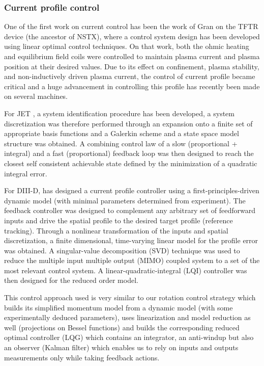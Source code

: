 \documentclass[12pt,lot, lof]{puthesis}
\begin{document}
\subsubsection{Current profile control}
One of the first work on current control has been the work of Gran \cite{Gran77} on the TFTR device (the ancestor of NSTX), where a control system design has been developed using linear optimal control techniques. On that work, both the ohmic heating and equilibrium field coils were controlled to maintain plasma current and plasma position at their desired values.
Due to its effect on confinement, plasma stability, and non-inductively driven plasma current, the control of current profile became critical and a huge advancement in controlling this profile has recently been made on several machines.

For JET \cite{Moreau03, Moreau08, Laborde05}, a system identification procedure has been developed, a system discretization was therefore performed through an expansion onto a finite set of appropriate basis functions and a Galerkin scheme and a state space model structure was obtained. A combining control law of a slow (proportional + integral) and a fast (proportional) feedback loop was then designed to reach the closest self consistent achievable state defined by the minimization of a quadratic integral error.

For DIII-D, \cite{ Boyer13} has designed a current profile controller using a first-principles-driven dynamic model (with minimal parameters determined from experiment). The feedback controller was designed to complement any arbitrary set of feedforward inputs and drive the spatial profile to the desired target profile (reference tracking). Through a nonlinear transformation of the inputs and spatial discretization, a finite dimensional, time-varying linear model for the profile error was obtained. A singular-value decomposition (SVD) technique was used to reduce the multiple input multiple output (MIMO) coupled system to a set of the most relevant control system. A linear-quadratic-integral (LQI) controller was then designed for the reduced order model. 

This control approach used is very similar to our rotation control strategy which builds its simplified momentum model from a dynamic model (with some experimentally deduced parameters), uses linearization and model reduction as well (projections on Bessel functions) and builds the corresponding reduced optimal controller (LQG) which contains an integrator, an anti-windup but also an observer (Kalman filter) which enables us to rely on inputs and outputs measurements only while taking feedback actions.
\end{document}
